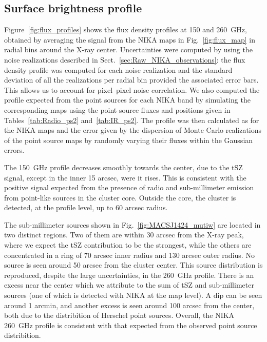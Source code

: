 \documentclass[twocolumn,traditabstract]{aa}
\begin{document}
\subsection{Surface brightness profile}\label{sec:surface_brightness_profiles_comparison}
Figure~\ref{fig:flux_profiles}  shows the flux density profiles at 150 and 260~GHz, obtained by averaging the signal from the NIKA maps in Fig.~\ref{fig:flux_map} in radial bins around the X-ray center.  
Uncertainties were computed by using the noise realizations described in Sect.~\ref{sec:Raw_NIKA_observations}: the flux density profile was computed for each noise realization and the standard deviation of all the realizations per radial bin provided the associated error bars. This allows us to account for pixel--pixel noise correlation. We also computed the profile expected from the point sources for each NIKA band by simulating the corresponding maps using the point source fluxes and positions given in Tables~\ref{tab:Radio_ps2} and~\ref{tab:IR_ps2}. The profile was then calculated as for the NIKA maps and the error given by the dispersion of Monte Carlo realizations of the point source maps by randomly varying their fluxes within the Gaussian errors.

The 150~GHz profile decreases smoothly towards the center, due to the tSZ signal, except in the inner 15 arcsec, were it rises. This is consistent with the positive signal expected from the presence of radio and sub-millimeter emission from point-like sources in the cluster core. Outside the core, the cluster is detected, at the profile level, up to 60 arcsec radius. 

The sub-millimeter sources shown in Fig.~\ref{fig:MACSJ1424_mutiw} are located in two distinct regions. Two of them are within 30 arcsec from the X-ray peak, where we expect the tSZ contribution to be the strongest, while the others are concentrated in a ring of 70 arcsec inner radius and 130 arcsec outer radius. No source is seen around 50 arcsec from the cluster center. This source distribution is reproduced, despite the large uncertainties, in the 260~GHz profile. There is an excess near the center which we attribute to the sum of tSZ and sub-millimeter sources (one of  which is detected with NIKA at the map level). A dip can be  seen around 1 arcmin, and another excess is seen around 100 arcsec from the center, both due to the distribition of Herschel point sources. Overall, the NIKA 260~GHz profile is consistent with that expected from the observed point source distribition.
\end{document}
